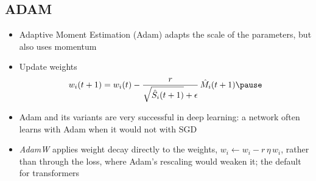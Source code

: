 
\begin{slide}
\section{ADAM}

\begin{PauseHighLight}
  \begin{itemize}\squeeze
  \item Adaptive Moment Estimation (Adam) adapts the scale of the
    parameters, but also uses momentum\pause
  \item Update weights
    \begin{align*}
      w_i(t+1) = w_i(t) - \frac{r}{\sqrt{\hat{S}_i(t+1)} + \epsilon}\,
      \hat{M}_i(t+1)\pause
    \end{align*}
  \item Adam and its variants are very successful in deep learning: a
    network often learns with Adam when it would not with SGD\pause
  \item \emph{AdamW} applies weight decay directly to the weights,
    $w_i \leftarrow w_i - r\,\eta\,w_i$, rather than through the loss,
    where Adam's rescaling would weaken it; the default for transformers\pause
  \end{itemize}
\end{PauseHighLight}

\end{slide}


